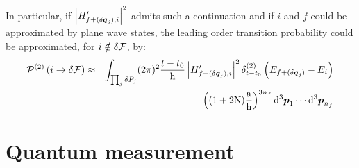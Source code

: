 \documentclass[10pt,a4paper,twoside,openany]{book}
\begin{document}
In particular, if $\left| H'_{f + (\delta \q_j),i} \right|^2$ admits such a continuation and if $i$ and $f$ could be approximated by plane wave states, the leading order transition probability could be approximated, for $i \notin \delta \F$, by:
\begin{eqnarray*}
\TPn i {\delta \F} 2 & \approx & \int_{\prod_j \delta P_j} ( 2 \pi )^2 \frac{t - t_0} \h \left| H'_{f + (\delta \q_j),i} \right|^2 \deltaE2{E_{f + (\delta \q_j)} - E_i} \\
&& \left( (1 + 2 \N) \frac \a \h \right)^{3 n_f} \dtp_1 \dotsm \dtp_{n_f}
\end{eqnarray*}

\section{Quantum measurement}
\label{Quantum measurement}
\end{document}
